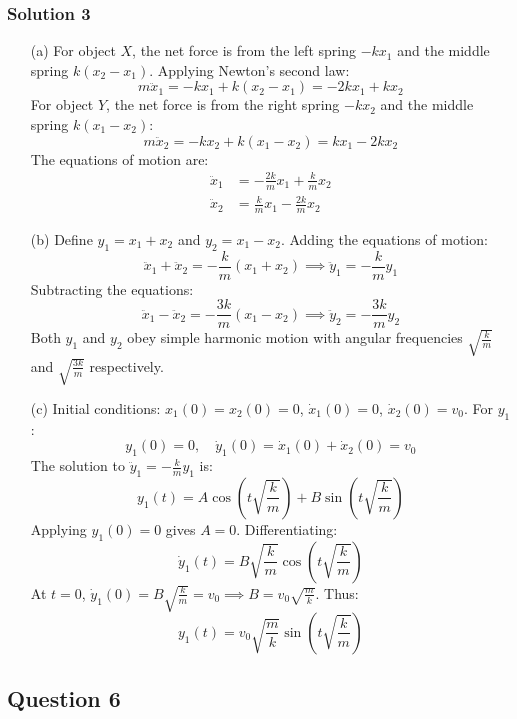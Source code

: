 \documentclass{article}
\begin{document}
\subsubsection{Solution 3}
\begin{enumerate}
    \item[(a)] For object $X$, the net force is from the left spring $-kx_1$ and the middle spring $k(x_2 - x_1)$. Applying Newton's second law:
    \[
    m \ddot{x}_1 = -kx_1 + k(x_2 - x_1) = -2kx_1 + kx_2
    \]
    For object $Y$, the net force is from the right spring $-kx_2$ and the middle spring $k(x_1 - x_2)$:
    \[
    m \ddot{x}_2 = -kx_2 + k(x_1 - x_2) = kx_1 - 2kx_2
    \]
    The equations of motion are:
    \begin{align*}
        \ddot{x}_1 &= -\frac{2k}{m}x_1 + \frac{k}{m}x_2 \\
        \ddot{x}_2 &= \frac{k}{m}x_1 - \frac{2k}{m}x_2
    \end{align*}

    \item[(b)] Define $y_1 = x_1 + x_2$ and $y_2 = x_1 - x_2$. Adding the equations of motion:
    \[
    \ddot{x}_1 + \ddot{x}_2 = -\frac{k}{m}(x_1 + x_2) \implies \ddot{y}_1 = -\frac{k}{m}y_1
    \]
    Subtracting the equations:
    \[
    \ddot{x}_1 - \ddot{x}_2 = -\frac{3k}{m}(x_1 - x_2) \implies \ddot{y}_2 = -\frac{3k}{m}y_2
    \]
    Both $y_1$ and $y_2$ obey simple harmonic motion with angular frequencies $\sqrt{\frac{k}{m}}$ and $\sqrt{\frac{3k}{m}}$ respectively.

    \item[(c)] Initial conditions: $x_1(0) = x_2(0) = 0$, $\dot{x}_1(0) = 0$, $\dot{x}_2(0) = v_0$. For $y_1$:
    \[
    y_1(0) = 0, \quad \dot{y}_1(0) = \dot{x}_1(0) + \dot{x}_2(0) = v_0
    \]
    The solution to $\ddot{y}_1 = -\frac{k}{m}y_1$ is:
    \[
    y_1(t) = A\cos\left(t\sqrt{\frac{k}{m}}\right) + B\sin\left(t\sqrt{\frac{k}{m}}\right)
    \]
    Applying $y_1(0) = 0$ gives $A = 0$. Differentiating:
    \[
    \dot{y}_1(t) = B\sqrt{\frac{k}{m}}\cos\left(t\sqrt{\frac{k}{m}}\right)
    \]
    At $t = 0$, $\dot{y}_1(0) = B\sqrt{\frac{k}{m}} = v_0 \implies B = v_0\sqrt{\frac{m}{k}}$. Thus:
    \[
    y_1(t) = v_0\sqrt{\frac{m}{k}}\sin\left(t\sqrt{\frac{k}{m}}\right)
    \]
\end{enumerate}

\subsection{Question 6}
\end{document}
